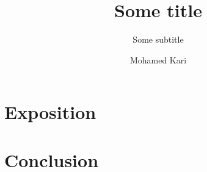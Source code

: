 \documentclass[
    headings=standardclasses,
    DIV=15
]{scrartcl}
\title{Some title}
\subtitle{Some subtitle}
\author{Mohamed Kari}
\date{} %
\begin{document}
\maketitle


\tableofcontents


\section{Exposition}
\section{Conclusion}





% 


% 
\clearpage
\printbibliography

\end{document}

